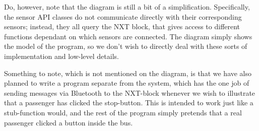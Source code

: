 Do, however, note that the diagram is still a bit of a simplification. Specifically, the sensor API classes do not communicate directly with their corresponding sensors; instead, they all query the NXT block, that gives access to different functions dependant on which sensors are connected. The diagram simply shows the model of the program, so we don't wish to directly deal with these sorts of implementation and low-level details. 

Something to note, which is not mentioned on the diagram, is that we have also planned to write a program separate from the system, which has the one job of sending messages via Bluetooth to the NXT-block whenever we wish to illustrate that a passenger has clicked the stop-button. This is intended to work just like a stub-function would, and the rest of the program simply pretends that a real passenger clicked a button inside the bus.
